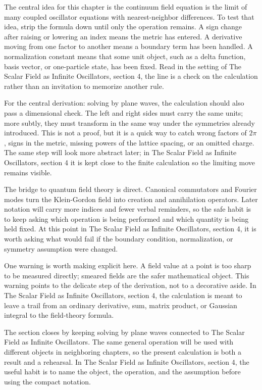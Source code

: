 The central idea for this chapter is the continuum field equation is the limit of many coupled oscillator equations with nearest-neighbor differences.  To test that idea, strip the formula down until only the operation remains.  A sign change after raising or lowering an index means the metric has entered.  A derivative moving from one factor to another means a boundary term has been handled.  A normalization constant means that some unit object, such as a delta function, basis vector, or one-particle state, has been fixed.  Read in the setting of The Scalar Field as Infinite Oscillators, section 4, the line is a check on the calculation rather than an invitation to memorize another rule.

For the central derivation: solving by plane waves, the calculation should also pass a dimensional check.  The left and right sides must carry the same units; more subtly, they must transform in the same way under the symmetries already introduced.  This is not a proof, but it is a quick way to catch wrong factors of \(2\pi\), signs in the metric, missing powers of the lattice spacing, or an omitted charge.  The same step will look more abstract later; in The Scalar Field as Infinite Oscillators, section 4 it is kept close to the finite calculation so the limiting move remains visible.

The bridge to quantum field theory is direct.  Canonical commutators and Fourier modes turn the Klein-Gordon field into creation and annihilation operators.  Later notation will carry more indices and fewer verbal reminders, so the safe habit is to keep asking which operation is being performed and which quantity is being held fixed.  At this point in The Scalar Field as Infinite Oscillators, section 4, it is worth asking what would fail if the boundary condition, normalization, or symmetry assumption were changed.

One warning is worth making explicit here.  A field value at a point is too sharp to be measured directly; smeared fields are the safer mathematical object.  This warning points to the delicate step of the derivation, not to a decorative aside.  In The Scalar Field as Infinite Oscillators, section 4, the calculation is meant to leave a trail from an ordinary derivative, sum, matrix product, or Gaussian integral to the field-theory formula.

The section closes by keeping solving by plane waves connected to The Scalar Field as Infinite Oscillators.  The same general operation will be used with different objects in neighboring chapters, so the present calculation is both a result and a rehearsal.  In The Scalar Field as Infinite Oscillators, section 4, the useful habit is to name the object, the operation, and the assumption before using the compact notation.



